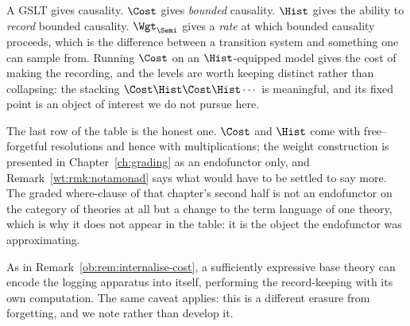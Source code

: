 A GSLT gives causality. $\Cost$ gives \emph{bounded} causality. $\Hist$ gives the ability
to \emph{record} bounded causality. $\Wgt_{\Semi}$ gives a \emph{rate} at which bounded
causality proceeds, which is the difference between a transition system and something one
can sample from. Running $\Cost$ on an $\Hist$-equipped model gives the
cost of making the recording, and the levels are worth keeping distinct rather than
collapsing: the stacking $\Cost\Hist\Cost\Hist\cdots$ is meaningful, and its fixed point
is an object of interest we do not pursue here.

The last row of the table is the honest one. $\Cost$ and $\Hist$ come with free--forgetful
resolutions and hence with multiplications; the weight construction is presented in
Chapter~\ref{ch:grading} as an endofunctor only, and Remark~\ref{wt:rmk:notamonad} says
what would have to be settled to say more. The graded where-clause of that chapter's
second half is not an endofunctor on the category of theories at all but a change to the
term language of one theory, which is why it does not appear in the table: it is the
object the endofunctor was approximating.

\begin{remark}
As in Remark~\ref{ob:rem:internalise-cost}, a sufficiently expressive base theory can encode
the logging apparatus into itself, performing the record-keeping with its own
computation. The same caveat applies: this is a different erasure from forgetting, and we
note rather than develop it.
\end{remark}
